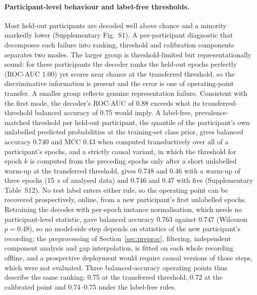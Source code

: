 \documentclass[pdflatex,sn-basic,Numbered,twocolumn,iicol]{sn-jnl}
\theoremstyle{thmstyleone}%
\theoremstyle{thmstyletwo}%
\theoremstyle{thmstylethree}%
\begin{document}
\paragraph{Participant-level behaviour and label-free thresholds.} Most held-out participants are decoded well above chance and a minority markedly lower (Supplementary Fig.~S1). A per-participant diagnostic that decomposes each failure into ranking, threshold and calibration components separates two modes. The larger group is threshold-limited but representationally sound: for these participants the decoder ranks the held-out epochs perfectly (ROC-AUC 1.00) yet scores near chance at the transferred threshold, so the discriminative information is present and the error is one of operating-point transfer. A smaller group reflects genuine representation failure. Consistent with the first mode, the decoder's ROC-AUC of 0.88 exceeds what its transferred-threshold balanced accuracy of 0.75 would imply. A label-free, prevalence-matched threshold per held-out participant, the quantile of the participant's own unlabelled predicted probabilities at the training-set class prior, gives balanced accuracy 0.740 and MCC 0.43 when computed transductively over all of a participant's epochs, and a strictly causal variant, in which the threshold for epoch $k$ is computed from the preceding epochs only after a short unlabelled warm-up at the transferred threshold, gives 0.748 and 0.46 with a warm-up of three epochs (15~s of analysed data) and 0.746 and 0.47 with five (Supplementary Table~S12). No test label enters either rule, so the operating point can be recovered prospectively, online, from a new participant's first unlabelled epochs. Retraining the decoder with per-epoch instance normalisation, which needs no participant-level statistic, gave balanced accuracy 0.763 against 0.747 (Wilcoxon $p=0.48$), so no model-side step depends on statistics of the new participant's recording; the preprocessing of Section~\ref{sec:preproc}, filtering, independent component analysis and gap interpolation, is fitted on each whole recording offline, and a prospective deployment would require causal versions of those steps, which were not evaluated. Three balanced-accuracy operating points thus describe the same ranking: 0.75 at the transferred threshold, 0.72 at the calibrated point and 0.74--0.75 under the label-free rules.
\end{document}
